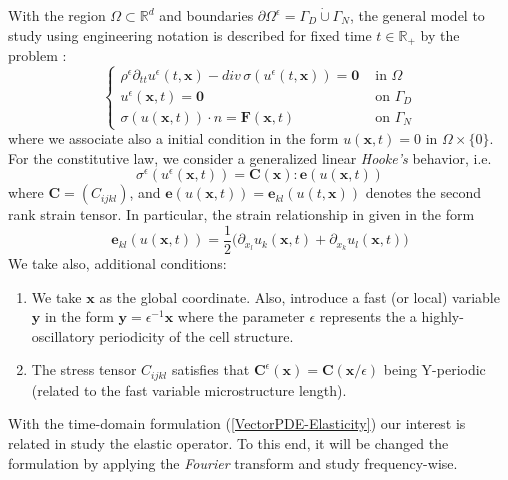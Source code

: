 With the region $\Omega \subset \mathbb{R}^d$ and boundaries $\partial \Omega^{\epsilon} = \Gamma_D \dot\cup \Gamma_N$, the general model to study using engineering notation is described for fixed time $t \in \mathbb{R}_+$ by the problem :
\begin{equation}
    \label{VectorPDE-Elasticity}
    \left \{ 
    \begin{array}{cc}
        \rho^{\epsilon}\partial_{tt} u^{\epsilon}(t,\mathbf{x}) - div \, \sigma(u^{\epsilon}(t,\mathbf{x})) = \mathbf{0} & \text{ in } \Omega \\
        u^{\epsilon}(\mathbf{x}, t) = \mathbf{0} & \text{ on } \Gamma_D\\
        \sigma(u(\mathbf{x},t)) \cdot n = \mathbf{F}(\mathbf{x},t) & \text{ on } \Gamma_N
    \end{array}
    \right .
\end{equation}
where we associate also a initial condition in the form $u(\mathbf{x}, t) = 0 \text{ in } \Omega \times \{0\}$. For the constitutive law, we consider a generalized linear \textit{Hooke's} behavior, i.e.
\begin{equation}
    \label{ConstituteEq}
    \sigma^{\epsilon}(u^{\epsilon}(\mathbf{x}, t)) = \mathbf{C}(\mathbf{x}) : \mathbf{e}(u(\mathbf{x},t)) 
\end{equation}
where $\mathbf{C} = (C_{ijkl})$, and $\mathbf{e}(u(\mathbf{x},t)) = \mathbf{e}_{kl}(u(t, \mathbf{x}))$ denotes the second rank strain tensor. In particular, the strain relationship in given in the form
\begin{equation}
    \label{StrainEq}
    \mathbf{e}_{kl} (u(\mathbf{x},t)) = \frac{1}{2}\big( \partial_{x_l} u_k(\mathbf{x},t) + \partial_{x_k} u_l (\mathbf{x},t) \big)
\end{equation}
We take also, additional conditions:
\begin{enumerate}
    \item We take $\mathbf{x}$ as the global coordinate. Also, introduce a fast (or local) variable $\mathbf{y}$ in the form $\mathbf{y} = \epsilon^{-1}\mathbf{x}$ where the parameter $\epsilon$ represents the a highly-oscillatory periodicity of the cell structure.
    \item The stress tensor $C_{ijkl}$ satisfies that $\mathbf{C}^{\epsilon} (\mathbf{x}) = \mathbf{C}(\mathbf{x}/\epsilon)$ being Y-periodic (related to the fast variable microstructure length).
\end{enumerate}

With the time-domain formulation (\ref{VectorPDE-Elasticity}) our interest is related in study the elastic operator. To this end, it will be changed the formulation by applying the \textit{Fourier} transform and study frequency-wise.

